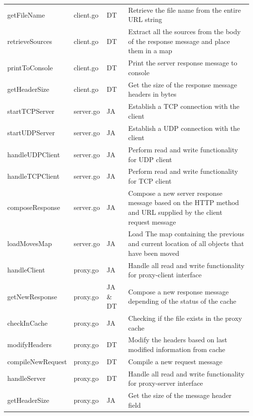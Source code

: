 \documentclass[10pt,twocolumn]{witseiepaper}
\begin{document}
\begin{table}[htbp]
\begin{tabular}{p{}| p{} | p{} | p{}}
				getFileName & client.go &	DT & Retrieve the file name from the entire URL string \\
				retrieveSources & client.go &	DT & Extract all the sources from the body of the response message and place them in a map \\
				printToConsole & client.go &	DT & Print the server response message to console \\
				getHeaderSize & client.go &	DT & Get the size of the response message headers in bytes \\
				startTCPServer & server.go & JA & Establish a TCP connection with the client \\
				startUDPServer & server.go & JA & Establish a UDP connection with the client \\
				handleUDPClient & server.go & JA & 	Perform read and write functionality for UDP client \\
				handleTCPClient & server.go & JA & Perform read and write functionality for TCP client \\
				composeResponse & server.go & JA & Compose a new server response message based on the HTTP method and URL supplied by the client request message \\
				loadMovesMap & server.go & JA & Load The map containing the previous and current location of all objects that have been moved \\
				handleClient & proxy.go & JA & Handle all read and write functionality for proxy-client interface \\
				getNewResponse & proxy.go & JA \& DT & Compose a new response message depending of the status of the cache \\
				checkInCache & proxy.go & JA & Checking if the file exists in the proxy cache \\
				modifyHeaders & proxy.go & DT & Modify the headers based on last modified information from cache \\
				compileNewRequest & proxy.go & DT & Compile a new request message \\
				handleServer & proxy.go & DT & Handle all read and write functionality for proxy-server interface \\
				getHeaderSize & proxy.go & JA & Get the size of the message header field \\				
				\hline
			\end{tabular}
		\end{table}

\clearpage
\end{document}
